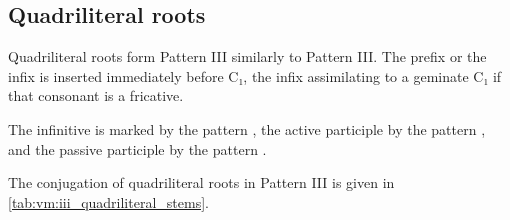 \documentclass[grammar]{subfiles}
\begin{document}
\subsection{Quadriliteral roots}
\label{ssec:vm:iii_quadriliteral_roots}

Quadriliteral roots form Pattern III similarly to Pattern III. The prefix
 or the infix  is inserted immediately before C₁, the infix
assimilating to a geminate C₁ if that consonant is a fricative. 

The infinitive is marked by the pattern , the active participle
by the pattern , and the passive participle by the pattern
.

The conjugation of quadriliteral roots in Pattern III is given in \cref{tab:vm:iii_quadriliteral_stems}.

\begin{table}[h!]\small\capstart
  \centering
  \\
  \caption{Pattern III quadriliteral stems\label{tab:vm:iii_quadriliteral_stems}}
\end{table}
\end{document}

